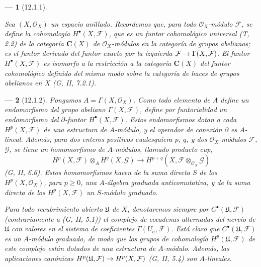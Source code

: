 \documentclass[10pt,oneside,openany]{book}
\theoremstyle{egaenv}\newtheorem*{env}{---}
\theoremstyle{egastatement}
\theoremstyle{egadescription}
\newcommand{\oldpage}[2][]{\marginnote{\normalfont\scriptsize\textbf{#1}\,|\,#2}\ignorespaces}
\renewcommand{\geq}{\geqslant}
\renewcommand{\to}{\mathchoice{\longrightarrow}{\rightarrow}{\rightarrow}{\rightarrow}}
\begin{document}
\begin{env}[12.1.1]
\label{0.12.1.1}
\label{0.12.1.1-fr}

Sea $(X,\mathcal O_X)$ un espacio anillado.
Recordemos que, para todo $\mathcal O_X$-módulo $\mathcal F$, se define la
\emph{cohomología} $H^\bullet(X,\mathcal F)$, que es un \emph{funtor cohomológico universal}
(T, 2.2) de la categoría $\boldsymbol{C}(X)$ de
$\mathcal O_X$-módulos en la categoría de grupos abelianos; es el funtor derivado
del funtor exacto por la izquierda
$\mathcal F\to\Gamma(X,\mathcal F)$.
El funtor $H^\bullet(X,\mathcal F)$ es isomorfo
\oldpage[0\textsubscript{III}]{50}
a la restricción a la categoría $\boldsymbol{C}(X)$ del funtor cohomológico
definido del mismo modo sobre la categoría de haces de grupos abelianos
en $X$ (G, II, 7.2.1).
\end{env}

\begin{env}[12.1.2]
\label{0.12.1.2}
\label{0.12.1.2-fr}
Pongamos $A=\Gamma(X,\mathcal O_X)$.
Como todo elemento de $A$ define un endomorfismo del grupo abeliano
$\Gamma(X,\mathcal F)$, define por funtorialidad un endomorfismo del
$\partial$-funtor $H^\bullet(X,\mathcal F)$.
Estos endomorfismos dotan a cada $H^p(X,\mathcal F)$ de una
estructura de $A$-\emph{módulo}, y el operador de conexión $\partial$ es
$A$-lineal. Además, para dos enteros positivos cualesquiera $p$, $q$, y dos $\mathcal O_X$-módulos $\mathcal F$, $\mathcal G$, se tiene un homomorfismo de $A$-módulos, llamado \emph{producto cup},
\[
\label{0.12.1.2.1-fr}
\tag{12.1.2.1}
H^p(X,\mathcal F)\otimes_A H^q(X,\mathcal G)
\longrightarrow H^{p+q}(X,\mathcal F\otimes_{\mathcal O_X}\mathcal G)
\]
(G, II, 6.6).
Estos homomorfismos hacen de la suma directa $S$ de los
$H^p(X,\mathcal O_X)$, para $p\geq0$, una $A$-\emph{álgebra graduada
anticomutativa}, y de la suma directa de los $H^p(X,\mathcal F)$ un
$S$-\emph{módulo graduado}.

Para todo recubrimiento abierto $\mathfrak U$ de $X$, denotaremos siempre
por $C^\bullet(\mathfrak U,\mathcal F)$ (contrariamente a
(G, II, 5.1)) el complejo de cocadenas alternadas del nervio de
$\mathfrak U$ con valores en el sistema de coeficientes
$\Gamma(U_\sigma,\mathcal F)$.
Está claro que
$C^\bullet(\mathfrak U,\mathcal F)$ es un
$A$-\emph{módulo graduado}, de modo que los grupos de cohomología
$H^p(\mathfrak U,\mathcal F)$ de este complejo están dotados de
una estructura de $A$-\emph{módulo}.
Además, las aplicaciones canónicas
$H^p(\mathfrak U,\mathcal F)\to H^p(X,\mathcal F)$
(G, II, 5.4) son $A$-\emph{lineales}.
\end{env}
\end{document}
